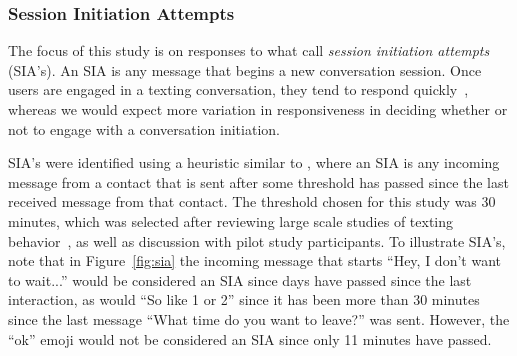 \documentclass[12pt]{nuthesis}	%
\begin{document}
\subsubsection{Session Initiation Attempts}

The focus of this study is on responses to what \citet{avrahami2006responsiveness} call \textit{session initiation attempts} (SIA's). An SIA is any message that begins a new conversation session. Once users are engaged in a texting conversation, they tend to respond quickly~\citep{battestini2010large}, whereas we would expect more variation in responsiveness in deciding whether or not to engage with a conversation initiation.

SIA's were identified using a heuristic similar to \citet{avrahami2006responsiveness}, where an SIA is any incoming message from a contact that is sent after some threshold has passed since the last received message from that contact. The threshold chosen for this study was 30 minutes, which was selected after reviewing large scale studies of texting behavior~\citep{battestini2010large,birnholtz2017attending}, as well as discussion with pilot study participants. To illustrate SIA's, note that in Figure~\ref{fig:sia} the incoming message that starts ``Hey, I don't want to wait...'' would be considered an SIA since days have passed since the last interaction, as would ``So like 1 or 2'' since it has been more than 30 minutes since the last message ``What time do you want to leave?'' was sent. However, the ``ok'' emoji would not be considered an SIA since only 11 minutes have passed.

\end{document}
